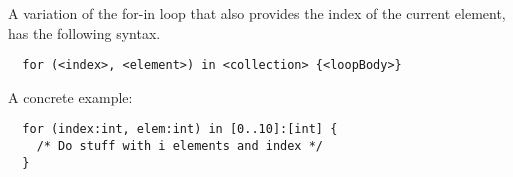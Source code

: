 A variation of the for-in loop that also provides the index of the current element, has the following syntax.

\begin{verbatim}
  for (<index>, <element>) in <collection> {<loopBody>}
\end{verbatim}

A concrete example:

\begin{verbatim}
  for (index:int, elem:int) in [0..10]:[int] { 
    /* Do stuff with i elements and index */ 
  }
\end{verbatim}